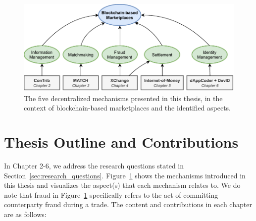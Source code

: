



\begin{figure}[t]
	\centering
	\includegraphics[width=\linewidth]{introduction/assets/thesis_overview}
	\caption{The five decentralized mechanisms presented in this thesis, in the context of blockchain-based marketplaces and the identified aspects.}
	\label{fig:thesis_overview}
\end{figure}

\section{Thesis Outline and Contributions}
In Chapter 2-6, we address the research questions stated in Section~\ref{sec:research_questions}.
Figure~\ref{fig:thesis_overview} shows the mechanisms introduced in this thesis and visualizes the aspect(s) that each mechanism relates to.
We do note that fraud in Figure~\ref{fig:thesis_overview} specifically refers to the act of committing counterparty fraud during a trade.
The content and contributions in each chapter are as follows:\\

